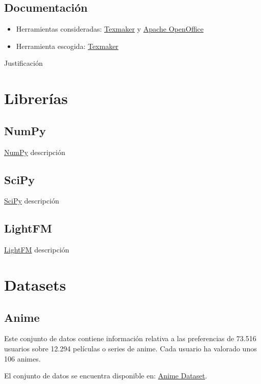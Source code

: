 \subsection{Documentación}\label{documentacion}
\begin{itemize}
\tightlist
\item Herramientas consideradas: 
	\href{http://www.xm1math.net/texmaker/}{Texmaker} y
	\href{https://www.openoffice.org/es/}{Apache OpenOffice}
\item Herramienta escogida:
	\href{http://www.xm1math.net/texmaker/}{Texmaker}
\end{itemize}
Justificación

\section{Librerías}\label{librerias}
\subsection{NumPy}\label{numpy}
\href{http://www.numpy.org/}{NumPy} descripción

\subsection{SciPy}\label{scipy}
\href{https://www.scipy.org/scipylib/index.html}{SciPy} descripción

\subsection{LightFM}\label{lightfm}
\href{https://github.com/lyst/lightfm}{LightFM} descripción

\section{Datasets}\label{datasets}
\subsection{Anime}\label{anime}
Este conjunto de datos \cite{CopperUnion2017} contiene información relativa a las preferencias de 73.516 usuarios sobre 12.294 películas o series de anime. Cada usuario ha valorado unos 106 animes.

El conjunto de datos se encuentra disponible en: \href{https://www.kaggle.com/CooperUnion/anime-recommendations-database/downloads/anime-recommendations-database.zip/1}{Anime Dataset}.

